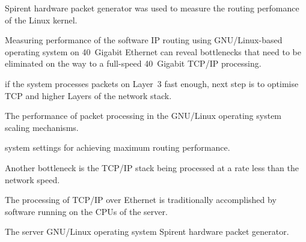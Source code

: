 Spirent hardware packet generator was used to measure the routing perfomance of the Linux kernel.



Measuring performance of the software IP routing using GNU/Linux-based operating system on 40~Gigabit Ethernet
can reveal bottlenecks that need to be eliminated
on the way to a full-speed 40~Gigabit TCP/IP processing.


if the system processes packets on Layer~3 fast enough,
next step is to optimise TCP and higher Layers of the network stack.





The performance of packet processing in the GNU/Linux operating
system 
scaling mechanisms.




system settings for achieving maximum routing performance.




Another bottleneck is the TCP/IP stack being processed at a rate less than the network speed.

The processing of TCP/IP over Ethernet is traditionally accomplished by software running on the CPUs of the server.





The server GNU/Linux operating system
Spirent hardware packet generator.

